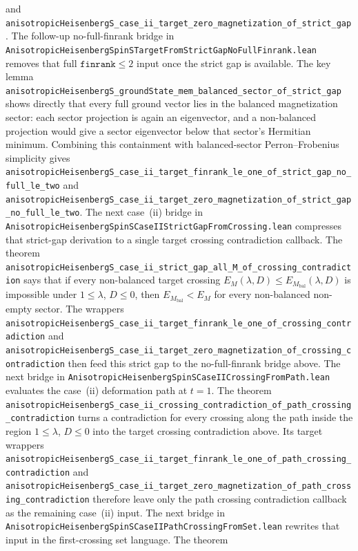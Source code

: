 \documentclass[a4paper,11pt]{article}
\begin{document}
and
\texttt{anisotropicHeisenbergS\_case\_ii\_target\_zero\_magnetization\_of\_strict\_gap}.
The follow-up no-full-finrank bridge in
\texttt{AnisotropicHeisenbergSpinSTargetFromStrictGapNoFullFinrank.lean}
removes that full \(\texttt{finrank}\le2\) input once the strict gap is
available.  The key lemma
\texttt{anisotropicHeisenbergS\_groundState\_mem\_balanced\_sector\_of\_strict\_gap}
shows directly that every full ground vector lies in the balanced
magnetization sector: each sector projection is again an eigenvector, and a
non-balanced projection would give a sector eigenvector below that sector's
Hermitian minimum.  Combining this containment with balanced-sector
Perron--Frobenius simplicity gives
\texttt{anisotropicHeisenbergS\_case\_ii\_target\_finrank\_le\_one\_of\_strict\_gap\_no\_full\_le\_two}
and
\texttt{anisotropicHeisenbergS\_case\_ii\_target\_zero\_magnetization\_of\_strict\_gap\_no\_full\_le\_two}.
The next case~(ii) bridge in
\texttt{AnisotropicHeisenbergSpinSCaseIIStrictGapFromCrossing.lean}
compresses that strict-gap derivation to a single target crossing
contradiction callback.  The theorem
\texttt{anisotropicHeisenbergS\_case\_ii\_strict\_gap\_all\_M\_of\_crossing\_contradiction}
says that if every non-balanced target crossing
\(E_M(\lambda,D)\le E_{M_{\mathrm{bal}}}(\lambda,D)\) is impossible under
\(1\le\lambda\), \(D\le0\), then \(E_{M_{\mathrm{bal}}}<E_M\) for every
non-balanced non-empty sector.  The wrappers
\texttt{anisotropicHeisenbergS\_case\_ii\_target\_finrank\_le\_one\_of\_crossing\_contradiction}
and
\texttt{anisotropicHeisenbergS\_case\_ii\_target\_zero\_magnetization\_of\_crossing\_contradiction}
then feed this strict gap to the no-full-finrank bridge above.  The next
bridge in
\texttt{AnisotropicHeisenbergSpinSCaseIICrossingFromPath.lean} evaluates the
case~(ii) deformation path at \(t=1\).  The theorem
\texttt{anisotropicHeisenbergS\_case\_ii\_crossing\_contradiction\_of\_path\_crossing\_contradiction}
turns a contradiction for every crossing along the path inside the region
\(1\le\lambda\), \(D\le0\) into the target crossing contradiction above.  Its
target wrappers
\texttt{anisotropicHeisenbergS\_case\_ii\_target\_finrank\_le\_one\_of\_path\_crossing\_contradiction}
and
\texttt{anisotropicHeisenbergS\_case\_ii\_target\_zero\_magnetization\_of\_path\_crossing\_contradiction}
therefore leave only the path crossing contradiction callback as the
remaining case~(ii) input.  The next bridge in
\texttt{AnisotropicHeisenbergSpinSCaseIIPathCrossingFromSet.lean} rewrites that
input in the first-crossing set language.  The theorem
\end{document}
